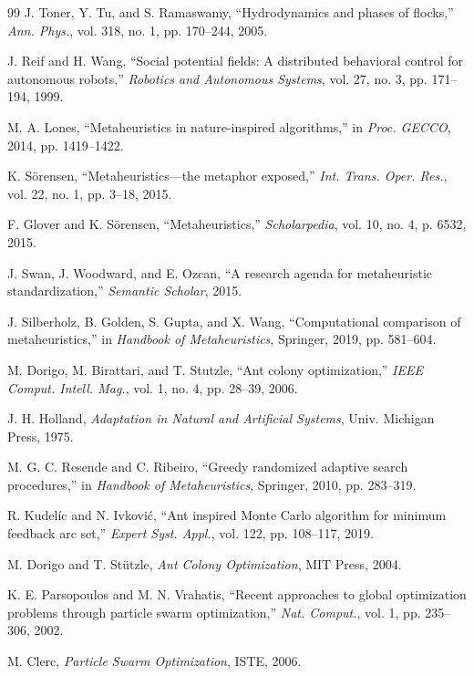 \documentclass[letterpaper, 10pt, conference]{IEEEtran}
\begin{document}
\begin{thebibliography}{99}
J. Toner, Y. Tu, and S. Ramaswamy, ``Hydrodynamics and phases of flocks,'' \emph{Ann. Phys.}, vol. 318, no. 1, pp. 170--244, 2005.

J. Reif and H. Wang, ``Social potential fields: A distributed behavioral control for autonomous robots,'' \emph{Robotics and Autonomous Systems}, vol. 27, no. 3, pp. 171--194, 1999.

M. A. Lones, ``Metaheuristics in nature-inspired algorithms,'' in \emph{Proc. GECCO}, 2014, pp. 1419--1422.

K. Sörensen, ``Metaheuristics---the metaphor exposed,'' \emph{Int. Trans. Oper. Res.}, vol. 22, no. 1, pp. 3--18, 2015.

F. Glover and K. Sörensen, ``Metaheuristics,'' \emph{Scholarpedia}, vol. 10, no. 4, p. 6532, 2015.

J. Swan, J. Woodward, and E. Ozcan, ``A research agenda for metaheuristic standardization,'' \emph{Semantic Scholar}, 2015.

J. Silberholz, B. Golden, S. Gupta, and X. Wang, ``Computational comparison of metaheuristics,'' in \emph{Handbook of Metaheuristics}, Springer, 2019, pp. 581--604.

M. Dorigo, M. Birattari, and T. Stutzle, ``Ant colony optimization,'' \emph{IEEE Comput. Intell. Mag.}, vol. 1, no. 4, pp. 28--39, 2006.

J. H. Holland, \emph{Adaptation in Natural and Artificial Systems}, Univ. Michigan Press, 1975.

M. G. C. Resende and C. Ribeiro, ``Greedy randomized adaptive search procedures,'' in \emph{Handbook of Metaheuristics}, Springer, 2010, pp. 283--319.

R. Kudel\'{i}c and N. Ivkovi\'{c}, ``Ant inspired Monte Carlo algorithm for minimum feedback arc set,'' \emph{Expert Syst. Appl.}, vol. 122, pp. 108--117, 2019.

M. Dorigo and T. St\"{u}tzle, \emph{Ant Colony Optimization}, MIT Press, 2004.

K. E. Parsopoulos and M. N. Vrahatis, ``Recent approaches to global optimization problems through particle swarm optimization,'' \emph{Nat. Comput.}, vol. 1, pp. 235--306, 2002.

M. Clerc, \emph{Particle Swarm Optimization}, ISTE, 2006.


\end{thebibliography}
\end{document}
